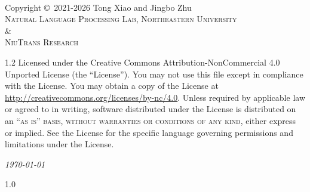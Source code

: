 \documentclass[11pt]{book}
\let\cleardoublepage\clearpage
\begin{document}
\prefrontmatter

~\vfill

\noindent Copyright \copyright\ 2021-2026 Tong Xiao and Jingbo Zhu\\

\noindent \textsc{Natural Language Processing Lab, Northeastern University}\\
\noindent \textsc{\&}\\
\noindent \textsc{NiuTrans Research}\\

\begin{spacing}{1.2}
\noindent Licensed under the Creative Commons Attribution-NonCommercial 4.0 Unported License (the ``License''). You may not use this file except in compliance with the License. You may obtain a copy of the License at \url{http://creativecommons.org/licenses/by-nc/4.0}. Unless required by applicable law or agreed to in writing, software distributed under the License is distributed on an \textsc{``as is'' basis, without warranties or conditions of any kind}, either express or implied. See the License for the specific language governing permissions and limitations under the License.
\end{spacing}

\noindent \textit{\today}


\cleardoublepage


\cleardoublepage

\renewcommand{\sectionmark}[1]{\markright{#1}}
\begin{spacing}{1.0}
\tableofcontents
\end{spacing}
\renewcommand{\sectionmark}[1]{\markright{\thesection\ #1}}

\mainmatter






\cleardoublepage

\renewcommand{\sectionmark}[1]{\markright{#1}}


\pagestyle{fancy}
\fancyhf{}
\fancyhead[LE,RO]{\thepage}
\renewcommand{\headrulewidth}{0.4pt}


\cleardoublepage

\pagestyle{fancy}
\fancyhf{}
\fancyhead[LE,RO]{\thepage}
\renewcommand{\headrulewidth}{0.4pt}

\appendix
{}

\printindex %
\end{document}
